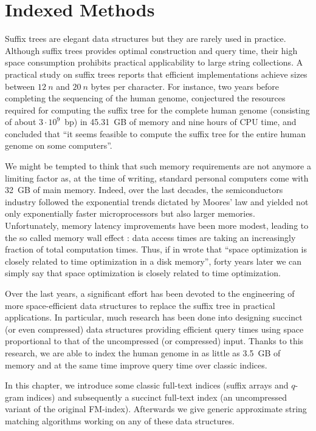 \chapter{Indexed Methods}
\label{chr:index}

Suffix trees are elegant data structures but they are rarely used in practice.
Although suffix trees provides optimal construction and query time, their high space consumption prohibits practical applicability to large string collections.
A practical study on suffix trees \citep{Kurtz1999} reports that efficient implementations achieve sizes between $12~n$ and $20~n$ bytes per character.
For instance, two years before completing the sequencing of the human genome, \citeauthor{Kurtz1999} conjectured the resources required for computing the suffix tree for the complete human genome (consisting of about $3 \cdot 10^9$~bp) in 45.31~GB of memory and nine hours of CPU time, and concluded that ``it seems feasible to compute the suffix tree for the entire human genome on some computers''.

We might be tempted to think that such memory requirements are not anymore a limiting factor as, at the time of writing, standard personal computers come with 32~GB of main memory.
Indeed, over the last decades, the semiconductors industry followed the exponential trends dictated by Moores' law and yielded not only exponentially faster microprocessors but also larger memories.
Unfortunately, memory latency improvements have been more modest, leading to the so called memory wall effect \citep{Wilkes1995}: data access times are taking an increasingly fraction of total computation times.
Thus, if in \citeyear{Knuth1973} \citeauthor{Knuth1973} wrote that ``space optimization is closely related to time optimization in a disk memory'', forty years later we can simply say that space optimization is closely related to time optimization.

Over the last years, a significant effort has been devoted to the engineering of more space-efficient data structures to replace the suffix tree in practical applications.
In particular, much research has been done into designing succinct (or even compressed) data structures providing efficient query times using space proportional to that of the uncompressed (or compressed) input.
Thanks to this research, we are able to index the human genome in as little as 3.5~GB of memory and at the same time improve query time over classic indices.

In this chapter, we introduce some classic full-text indices (suffix arrays and $q$-gram indices) and subsequently a succinct full-text index (an uncompressed variant of the original FM-index).
Afterwards we give generic approximate string matching algorithms working on any of these data structures.


